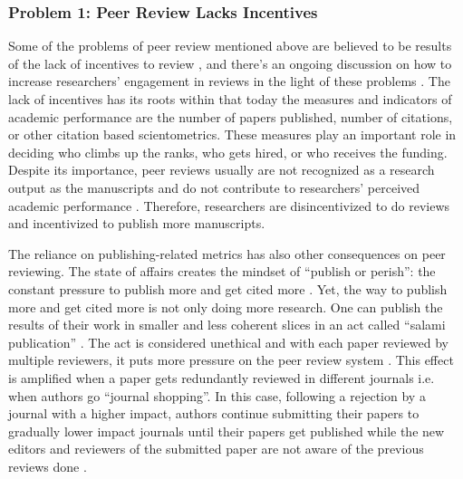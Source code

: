 \subsubsection{Problem 1: Peer Review Lacks Incentives}

Some of the problems of peer review mentioned above are believed to be results of the lack of incentives to review \parencite{Derraik.2015, Willis.2016}, and there’s an ongoing discussion on how to increase researchers’ engagement in reviews in the light of these problems \parencite{Derraik.2015, Gasparyan.2015, Hauser.2007, Squazzoni.2013}. The lack of incentives has its roots within that today the measures and indicators of academic performance are the number of papers published, number of citations, or other citation based scientometrics. These measures play an important role in deciding who climbs up the ranks, who gets hired, or who receives the funding. Despite its importance, peer reviews usually are not recognized as a research output as the manuscripts and do not contribute to researchers’ perceived academic performance \parencite{Tennant.2017}. Therefore, researchers are disincentivized to do reviews and incentivized to publish more manuscripts.

The reliance on publishing-related metrics has also other consequences on peer reviewing. The state of affairs creates the mindset of “publish or perish”: the constant pressure to publish more and get cited more \parencite{Rawat.2014}. Yet, the way to publish more and get cited more is not only doing more research. One can publish the results of their work in smaller and less coherent slices \parencite[4]{Ferreira.2016} in an act called “salami publication” \parencite{SupakSmolcic.2013}. The act is considered unethical \parencite[238]{SupakSmolcic.2013} and with each paper reviewed by multiple reviewers, it puts more pressure on the peer review system \parencite[4]{Ferreira.2016}. This effect is amplified when a paper gets redundantly reviewed in different journals i.e. when authors go “journal shopping”. In this case, following a rejection by a journal with a higher impact, authors continue submitting their papers to gradually lower impact journals until their papers get published while the new editors and reviewers of the submitted paper are not aware of the previous reviews done \parencite[10]{Kovanis.2016}. 

